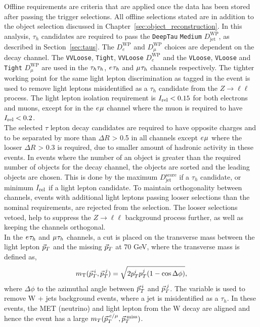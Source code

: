 Offline requirements are criteria that are applied once the data has been stored after passing the trigger selections.
All offline selections stated are in addition to the object selection discussed in Chapter~\ref{sec:object_reconstruction}.
In this analysis, $\tau_h$ candidates are required to pass the \texttt{DeepTau} \texttt{Medium} $D_{\text{jet}}^{\text{WP}}$, as described in Section~\ref{sec:taus}.
The $D_{e}^{\text{WP}}$ and $D_{\mu}^{\text{WP}}$ choices are dependent on the decay channel.
The \texttt{VVLoose}, \texttt{Tight}, \texttt{VVLoose} $D_{e}^{\text{WP}}$ and the \texttt{VLoose}, \texttt{VLoose} and \texttt{Tight} $D_{\mu}^{\text{WP}}$ are used in the $\tau_{h}\tau_{h}$, $e_{}\tau_{h}$ and $\mu_{}\tau_{h}$ channels respectively.
The tighter working point for the same light lepton discrimination as tagged in the event is used to remove light leptons misidentified as a $\tau_h$ candidate from the $Z \rightarrow \ell\ell$ process.
The light lepton isolation requirement is $I_{\text{rel}} < 0.15$ for both electrons and muons, except for in the $e_{}\mu_{}$ channel where the muon is required to have $I_{\text{rel}} < 0.2$. \\

The selected $\tau$ lepton decay candidates are required to have opposite charges and to be separated by more than $\Delta R$ > 0.5 in all channels except $e_{}\mu_{}$ where the looser $\Delta R$ > 0.3 is required, due to smaller amount of hadronic activity in these events.
In events where the number of an object is greater than the required number of objects for the decay channel, the objects are sorted and the leading objects are chosen.
This is done by the maximum $D_{\text{jet}}^{\text{score}}$ if a $\tau_h$ candidate, or minimum $I_{\text{rel}}$ if a light lepton candidate.
To maintain orthogonality between channels, events with additional light leptons passing looser selections than the nominal requirements, are rejected from the selection.
The looser selections vetoed, help to suppress the $Z \rightarrow \ell\ell$ background process further, as well as keeping the channels orthogonal. \\

In the $e_{}\tau_{h}$ and $\mu_{}\tau_{h}$ channels, a cut is placed on the transverse mass between the light lepton $\vec{p}_{T}$ and the missing $\vec{p}_{T}$ at 70 GeV, where the transverse mass is defined as,
\begin{equation}
m_{\text{T}}(\vec{p}_{T}^{\hspace{2pt}i},\vec{p}_{T}^{\hspace{2pt}j}) = \sqrt{2p_{T}^{i}p_{T}^{j}(1-\cos\Delta\phi)},
\label{eqn:mt}
\end{equation}
where $\Delta\phi$ to the azimuthal angle between $\vec{p}_{T}^{\hspace{2pt}i}$ and $\vec{p}_{T}^{\hspace{2pt}j}$.
The variable is used to remove W + jets background events, where a jet is misidentified as a $\tau_h$.
In these events, the \ac{MET} (neutrino) and light lepton from the W decay are aligned and hence the event has a large $m_{T}(\vec{p}_{T}^{\hspace{2pt}e/\mu},\vec{p}_{T}^{\hspace{2pt}\text{miss}})$. \\

